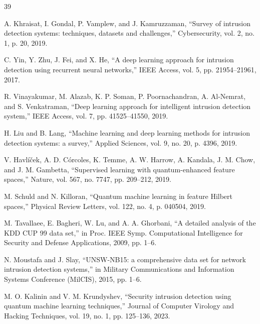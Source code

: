\begin{thebibliography}{39}

A. Khraisat, I. Gondal, P. Vamplew, and J. Kamruzzaman, ``Survey of intrusion detection systems: techniques, datasets and challenges,'' Cybersecurity, vol. 2, no. 1, p. 20, 2019.

C. Yin, Y. Zhu, J. Fei, and X. He, ``A deep learning approach for intrusion detection using recurrent neural networks,'' IEEE Access, vol. 5, pp. 21954--21961, 2017.

R. Vinayakumar, M. Alazab, K. P. Soman, P. Poornachandran, A. Al-Nemrat, and S. Venkatraman, ``Deep learning approach for intelligent intrusion detection system,'' IEEE Access, vol. 7, pp. 41525--41550, 2019.

H. Liu and B. Lang, ``Machine learning and deep learning methods for intrusion detection systems: a survey,'' Applied Sciences, vol. 9, no. 20, p. 4396, 2019.

V. Havl\'i\v{c}ek, A. D. C\'orcoles, K. Temme, A. W. Harrow, A. Kandala, J. M. Chow, and J. M. Gambetta, ``Supervised learning with quantum-enhanced feature spaces,'' Nature, vol. 567, no. 7747, pp. 209--212, 2019.

M. Schuld and N. Killoran, ``Quantum machine learning in feature Hilbert spaces,'' Physical Review Letters, vol. 122, no. 4, p. 040504, 2019.

M. Tavallaee, E. Bagheri, W. Lu, and A. A. Ghorbani, ``A detailed analysis of the KDD CUP 99 data set,'' in Proc. IEEE Symp. Computational Intelligence for Security and Defense Applications, 2009, pp. 1--6.

N. Moustafa and J. Slay, ``UNSW-NB15: a comprehensive data set for network intrusion detection systems,'' in Military Communications and Information Systems Conference (MilCIS), 2015, pp. 1--6.


M. O. Kalinin and V. M. Krundyshev, ``Security intrusion detection using quantum machine learning techniques,'' Journal of Computer Virology and Hacking Techniques, vol. 19, no. 1, pp. 125--136, 2023.


\end{thebibliography}
